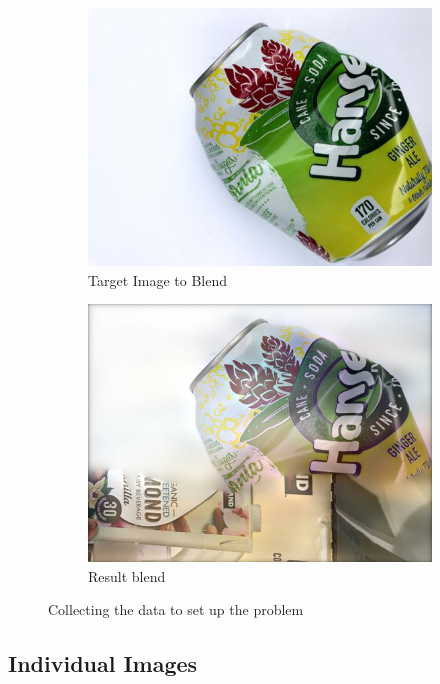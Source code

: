 \documentclass{article}
\begin{document}
\begin{figure}
\begin{subfigure}[b]{0.2\linewidth}
    \includegraphics[width=\linewidth]{data/images/section_4_GP_GAN/metal14.jpg}
    \caption{Target Image to Blend}
  \end{subfigure}
  \begin{subfigure}[b]{0.2\linewidth}
    \includegraphics[width=\linewidth]{data/images/section_4_GP_GAN/result-cardboard331-metal14.png}
    \caption{Result blend}
  \end{subfigure}
  \caption{Collecting the data to set up the problem}
  \label{fig:GAN_Blending}
\end{figure}



\subsection{Individual Images}
\end{document}
